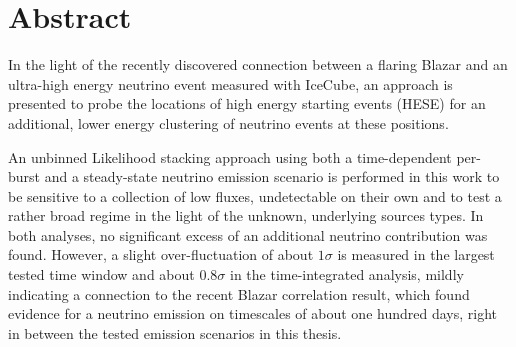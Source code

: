 \thispagestyle{plain}

\section*{Abstract}
In the light of the recently discovered connection between a flaring Blazar and an ultra-high energy neutrino event measured with IceCube, an approach is presented to probe the locations of high energy starting events (HESE) for an additional, lower energy clustering of neutrino events at these positions.

An unbinned Likelihood stacking approach using both a time-dependent per-burst and a steady-state neutrino emission scenario is performed in this work to be sensitive to a collection of low fluxes, undetectable on their own and to test a rather broad regime in the light of the unknown, underlying sources types.
In both analyses, no significant excess of an additional neutrino contribution was found.
However, a slight over-fluctuation of about $1\sigma$ is measured in the largest tested time window and about $0.8\sigma$ in the time-integrated analysis, mildly indicating a connection to the recent Blazar correlation result, which found evidence for a neutrino emission on timescales of about one hundred days, right in between the tested emission scenarios in this thesis.

